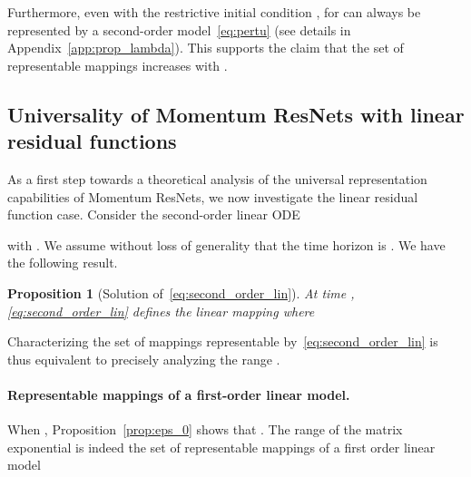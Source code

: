 \documentclass{article}
\newtheorem{proposition}{Proposition}
\begin{document}
Furthermore, even with the restrictive initial condition ,  for  can always be represented by a second-order model~\eqref{eq:pertu}
(see details in Appendix~\ref{app:prop_lambda}).
This supports the claim that the set of representable mappings increases with . 

\subsection{Universality of Momentum ResNets with linear residual functions}

As a first step towards a theoretical analysis of the universal representation capabilities of Momentum ResNets, we now investigate the linear residual function case.
Consider the second-order linear ODE 

with . We assume without loss of generality that the time horizon is . We have the following result.
\begin{proposition}[Solution of~\eqref{eq:second_order_lin}]\label{prop:sol_second_order}
At time , \eqref{eq:second_order_lin} defines the linear mapping  where 

\end{proposition}
Characterizing the set of mappings representable by~\eqref{eq:second_order_lin} is thus equivalent to precisely analyzing the range .


\paragraph{Representable mappings of a first-order linear model.}


When , Proposition~\ref{prop:eps_0} shows that
 . 
The range of the matrix exponential is indeed the set of representable mappings of a first order linear model 
\end{document}
